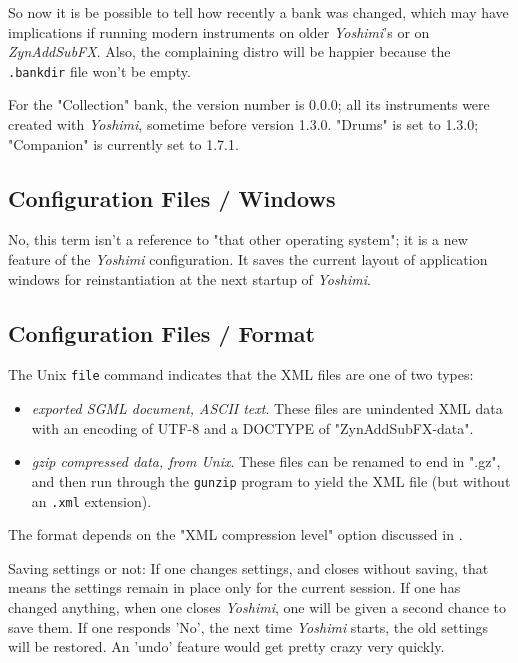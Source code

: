    So now it is be possible to tell how recently a bank was changed, which may
   have implications if running modern instruments on older \textsl{Yoshimi}'s or
   on \textsl{ZynAddSubFX}. Also, the complaining distro will be happier because
   the \texttt{.bankdir} file won't be empty.

   For the "Collection" bank, the version number is 0.0.0; all its instruments
   were created with \textsl{Yoshimi}, sometime before version 1.3.0.  "Drums" is
   set to 1.3.0; "Companion" is currently set to 1.7.1.

\subsection{Configuration Files / Windows}
\label{subsec:configuration_windows}

   No, this term isn't a reference to "that other operating system";
   it is a new feature of the \textsl{Yoshimi} configuration.
   It saves the current layout of application
   windows for reinstantiation at the next startup
   of \textsl{Yoshimi}.

\subsection{Configuration Files / Format}
\label{subsec:configuration_file_format}

   The Unix \texttt{file} command indicates that the XML files are one of
   two types:

   \begin{itemize}
      \item \textsl{exported SGML document, ASCII text}.
         These files are unindented XML data with an encoding of UTF-8 and
         a DOCTYPE of "ZynAddSubFX-data".
      \item \textsl{gzip compressed data, from Unix}.
         These files can be renamed to end in ".gz", and then run through
         the \texttt{gunzip} program to yield the XML file (but without an
         \texttt{.xml} extension).
   \end{itemize}

   The format depends on the "XML compression level" option discussed in
   .

   Saving settings or not:
   If one changes settings, and closes without saving, that means the settings
   remain in place only for the current session. If one has changed anything,
   when one closes \textsl{Yoshimi}, one will be given a second chance to
   save them. If one responds 'No',  the next time \textsl{Yoshimi} starts,
   the old settings will be restored.  An 'undo' feature would get pretty
   crazy very quickly.

